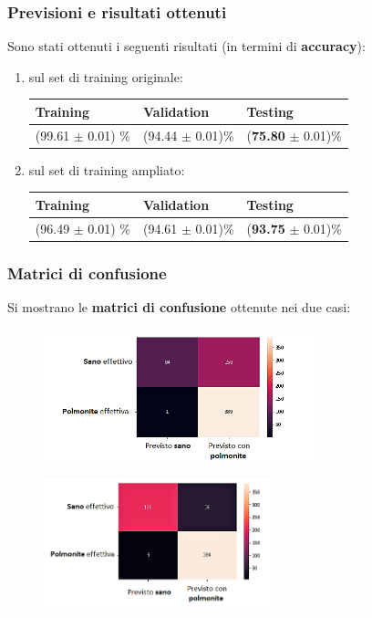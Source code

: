 \documentclass{beamer}
\begin{document}
\begin{frame}
	\frametitle{Previsioni e risultati ottenuti}
	Sono stati ottenuti i seguenti risultati (in termini di \textbf{accuracy}):
	\begin{enumerate}
		\item sul set di training originale:

	\begin{table}[width=0.8\textwidth]
		\begin{tabular}{lll}
		\textbf{Training} & \textbf{Validation} & \textbf{Testing} \\ \hline
		(99.61 $\pm$ 0.01) \%           & (94.44  $\pm$ 0.01)\%   &	(\textbf{75.80} $\pm$ 0.01)\%         
		\end{tabular}
		\end{table}
		\smallskip

	
				\item sul set di training ampliato:
	
	\begin{table}[width=0.8\textwidth]
		\begin{tabular}{lll}
		\textbf{Training}  & \textbf{Validation} & \textbf{Testing} \\ \hline
		(96.49 $\pm$ 0.01) \%           & (94.61  $\pm$ 0.01)\%   &	(\textbf{93.75} $\pm$ 0.01)\%         
		\end{tabular}
		\end{table}
	\end{enumerate}
	
\end{frame}


\begin{frame}
	\frametitle{Matrici di confusione}
	Si mostrano le \textbf{matrici di confusione} ottenute nei due casi:
	\medskip
	\begin{figure}
		\includegraphics[width=0.7\textwidth]{conf-matrix-no-aug.png}
	\end{figure}

\begin{figure}
	\includegraphics[width=0.6\textwidth]{conf-matrix-pneumonia-aug.png}
\end{figure}	
\end{frame}
\end{document}
